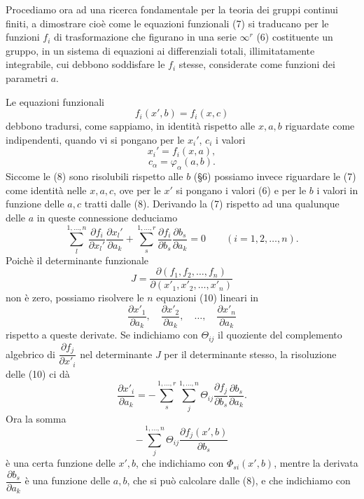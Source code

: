 \documentclass[11pt]{book}
\begin{document}
Procediamo ora ad una ricerca fondamentale per la teoria dei gruppi continui finiti, a dimostrare cioè come le equazioni funzionali (7) si traducano per le funzioni $f_i$ di trasformazione che figurano in una serie $\infty^r$ (6) costituente un gruppo, in un sistema di equazioni ai differenziali totali, illimitatamente integrabile, cui debbono soddisfare le $f_i$ stesse, considerate come funzioni dei parametri $a$.

Le equazioni funzionali
\begin{equation*}\tag{7}
 f_i(x',b)=f_i(x,c)
\end{equation*}
debbono tradursi, come sappiamo, in identità rispetto alle $x,a,b$ riguardate come indipendenti, quando vi si pongano per le $x_i'$, $c_i$ i valori
\begin{equation*}\tag{6}
 x_i'=f_i(x,a),
\end{equation*}
\begin{equation*}\tag{8}
 c_\alpha=\varphi_\alpha(a,b).
\end{equation*}
Siccome le (8) sono risolubili rispetto alle $b$ (\S{}6) possiamo invece riguardare le (7) come identità nelle $x,a,c$, ove per le $x'$ si pongano i valori (6) e per le $b$ i valori in funzione delle $a,c$ tratti dalle (8). Derivando la (7) rispetto ad una qualunque delle $a$ in queste connessione deduciamo
\begin{equation*}\tag{10}
 \sum\limits_l^{1,\ldots,n}\frac{\partial f_i}{\partial x_l'}\frac{\partial x_l'}{\partial a_k}
 +\sum\limits_s^{1,\ldots,r}\frac{\partial f_i}{\partial b_s}\frac{\partial b_s}{\partial a_k}=0
 \qquad (i=1,2,\ldots,n).
\end{equation*}
Poichè il determinante funzionale
\[
 J=\frac{\partial(f_1,f_2,\ldots,f_n)}{\partial(x'_1,x'_2,\ldots,x'_n)}
\]
non è zero, possiamo risolvere le $n$ equazioni (10) lineari in
\[
 \frac{\partial x'_1}{\partial a_k},\quad
 \frac{\partial x'_2}{\partial a_k},\quad\ldots,\quad
 \frac{\partial x'_n}{\partial a_k}
\]
rispetto a queste derivate. Se indichiamo con $\Theta_{ij}$ il quoziente del complemento algebrico di $\dfrac{\partial f_j}{\partial x'_i}$ nel determinante $J$ per il determinante stesso, la risoluzione delle (10) ci dà
\[
 \frac{\partial x'_i}{\partial a_k}
 =-\sum\limits_s^{1,\ldots,r}\sum\limits_j^{1,\ldots,n}
 \Theta_{ij}\frac{\partial f_j}{\partial b_s}\frac{\partial b_s}{\partial a_k}.
\]
Ora la somma
\[
 -\sum\limits_j^{1,\ldots,n}\Theta_{ij}\frac{\partial f_j(x',b)}{\partial b_s}
\]
è una certa funzione delle $x',b$, che indichiamo con $\Phi_{si}(x',b)$, mentre la derivata $\dfrac{\partial b_s}{\partial a_k}$ è una funzione delle $a,b$, che si può calcolare dalle (8), e che indichiamo con
\end{document}
